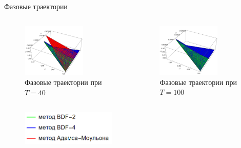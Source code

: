 \documentclass[ignoreonframetext,unicode]{beamer}
\begin{document}
\begin{frame}{Фазовые траектории}
	
	\begin{columns}
	
	\begin{figure}[!htbp]
		\centering
		\includegraphics[width=0.7\textwidth]{T40-0}%
		\caption{Фазовые траектории при $T = 40$}
		\vspace*{-2mm}
		\label{T40-0}
	\end{figure}

	\begin{figure}[!htbp]
		\centering
		\includegraphics[width=0.7\textwidth]{T100-0}%
		\caption{Фазовые траектории при $T = 100$}
		\vspace*{-2mm}
		\label{T100-0}
	\end{figure}
	\end{columns}

	\begin{figure}[!htbp]
		\centering
		\includegraphics[width=0.4\textwidth]{graph-legend}%
	\end{figure}
\end{frame}
\end{document}
